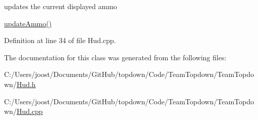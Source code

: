 updates the current displayed ammo 

\hyperlink{class_hud_a9fdcb19f4fd4d323dc7b3dd09bd85a08}{update\+Ammo()} 

Definition at line 34 of file Hud.\+cpp.



The documentation for this class was generated from the following files\+:\begin{DoxyCompactItemize}
\item 
C\+:/\+Users/joost/\+Documents/\+Git\+Hub/topdown/\+Code/\+Team\+Topdown/\+Team\+Topdown/\hyperlink{_hud_8h}{Hud.\+h}\item 
C\+:/\+Users/joost/\+Documents/\+Git\+Hub/topdown/\+Code/\+Team\+Topdown/\+Team\+Topdown/\hyperlink{_hud_8cpp}{Hud.\+cpp}\end{DoxyCompactItemize}
